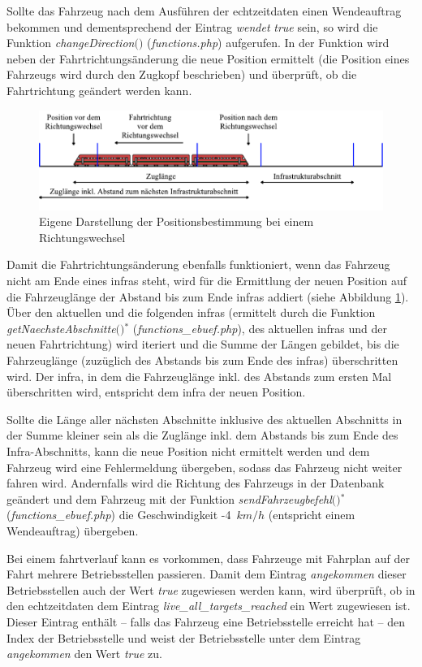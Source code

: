 Sollte das Fahrzeug nach dem Ausführen der \Gls{echtzeitdaten} einen Wendeauftrag bekommen und dementsprechend der Eintrag \textit{wendet} \textit{true} sein, so wird die Funktion \textit{change\-Direction$($$)$} (\textit{functions.php}) aufgerufen. In der Funktion wird neben der Fahrtrichtungsänderung die neue Position ermittelt (die Position eines Fahrzeugs wird durch den Zugkopf beschrieben) und überprüft, ob die Fahrtrichtung geändert werden kann. 
\begin{figure}
  \includegraphics[width=\linewidth]{../images/vector/richtungsaenderung.pdf}
  \caption{Eigene Darstellung der Positionsbestimmung bei einem Richtungswechsel}
  \label{fig:richtungsaenderung}
\end{figure}
Damit die Fahrtrichtungsänderung ebenfalls funktioniert, wenn das Fahrzeug nicht am Ende eines \ac{infra}s steht, wird für die Ermittlung der neuen Position auf die Fahrzeuglänge der Abstand bis zum Ende \ac{infra}s addiert (siehe Abbildung \ref{fig:richtungsaenderung}). Über den aktuellen und die folgenden \acp{infra} (ermittelt durch die Funktion \textit{getNaechsteAbschnitte$($$)$}$^\ast$ (\textit{functions\_ebuef.php}), des aktuellen \ac{infra}s und der neuen Fahrtrichtung) wird iteriert und die Summe der Längen gebildet, bis die Fahrzeuglänge (zuzüglich des Abstands bis zum Ende des \ac{infra}s) überschritten wird. Der \ac{infra}, in dem die Fahrzeuglänge inkl. des Abstands zum ersten Mal überschritten wird, entspricht dem \ac{infra} der neuen Position.

Sollte die Länge aller nächsten Abschnitte inklusive des aktuellen Abschnitts in der Summe kleiner sein als die Zuglänge inkl. dem Abstands bis zum Ende des Infra-Abschnitts, kann die neue Position nicht ermittelt werden und dem Fahrzeug wird eine Fehlermeldung übergeben, sodass das Fahrzeug nicht weiter fahren wird. Andernfalls wird die Richtung des Fahrzeugs in der Datenbank geändert und dem Fahrzeug mit der Funktion \textit{send\-Fahrzeugbefehl$($$)$}$^\ast$ (\textit{functions\_ebuef.php}) die Geschwindigkeit \mbox{-4 $km/h$} (entspricht einem Wendeauftrag) übergeben.

Bei einem \Gls{fahrtverlauf} kann es vorkommen, dass Fahrzeuge mit Fahrplan auf der Fahrt mehrere Betriebsstellen passieren. Damit dem Eintrag \textit{angekommen} dieser Betriebsstellen auch der Wert \textit{true} zugewiesen werden kann, wird überprüft, ob in den \Gls{echtzeitdaten} dem Eintrag \textit{live\_all\_targets\_reached} ein Wert zugewiesen ist. Dieser Eintrag enthält -- falls das Fahrzeug eine Betriebsstelle erreicht hat -- den Index der Betriebsstelle und weist der Betriebsstelle unter dem Eintrag \textit{angekommen} den Wert \textit{true} zu.

